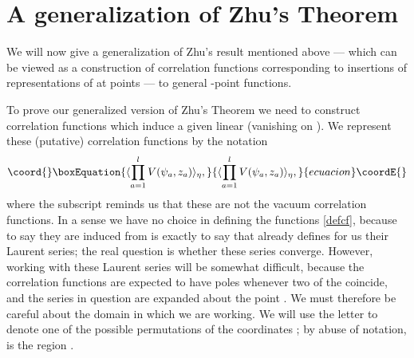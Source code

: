 \documentclass[a4paper,12pt]{article}
\providecommand{\C}{{\mathbb C}}
\providecommand{\uu}{{\mathbf u}}
\providecommand{\zz}{{\mathbf z}}
\providecommand{\F}{{\mathcal H}}
\providecommand{\abs}[1]{\lvert#1\rvert}
\providecommand{\IP}[1]{\langle#1\rangle}
\begin{document}
\section{A generalization of Zhu's Theorem} \label{zhugen}

We will now give a generalization of Zhu's result mentioned above ---
which can be viewed as a construction of correlation functions
corresponding to insertions of representations of \coordHE{} at \coordHE{} 
points --- to general \coordHE{}-point functions.

To prove our generalized version of Zhu's Theorem we need to construct correlation functions 
which induce a given linear \myHighlight{$\eta: \F \to \C$}\coordHE{} (vanishing on \myHighlight{$O_\uu$}\coordHE{}).
We represent these (putative) correlation functions by the notation
\begin{equation}\coord{}\boxEquation{ \label{defcf}
\IP{\prod_{a=1}^l V(\psi_a, z_a)}_\eta,
}{ \IP{\prod_{a=1}^l V(\psi_a, z_a)}_\eta,
}{ecuacion}\coordE{}\end{equation}
where the subscript \myHighlight{$\eta$}\coordHE{} reminds us that these are not the
vacuum correlation functions.
In a sense we have no choice in defining the functions \eqref{defcf},
because to say they are induced from \myHighlight{$\eta$}\coordHE{} is exactly to say that
\myHighlight{$\eta$}\coordHE{} already defines for us their Laurent series; the real question is whether these series converge.  However, working with these
Laurent series will be somewhat difficult, because the correlation functions are 
expected to have poles whenever two
of the \coordHE{} coincide, and the series in question are expanded about the point \myHighlight{$\zz = (0, \dots, 0)$}\coordHE{}.
We must therefore be careful about the domain in which we are working.
We will use the letter \coordHE{} to denote one of the \coordHE{} 
possible permutations of the coordinates \coordHE{}; by
abuse of notation, \coordHE{} is the region \myHighlight{$\{\zz: \abs{z_{R(1)}} > \abs{z_{R(2)}} > \cdots > \abs{z_{R(l)}}\}$}\coordHE{}.
\end{document}
